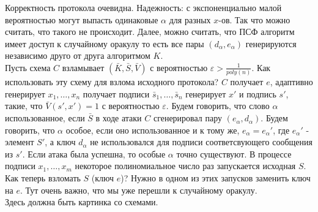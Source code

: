 \documentclass[a4paper]{article}
\theoremstyle{definition}
\theoremstyle{plain}
\begin{document}
\noindent Корректность протокола очевидна. Надежность: с экспоненциально малой вероятностью
могут выпасть одинаковые $\alpha$ для разных $x$-ов. Так что можно считать, что
такого не происходит. Далее, можно считать, что ПСФ алгоритм имеет доступ к случайному оракулу то есть
все пары $(d_{\alpha}, e_{\alpha})$ генерируются независимо друго от друга алгоритмом $K$.~\\

\noindent Пусть схема $C$ взламывает $(\bar{K}, \bar{S}, \bar{V})$
с вероятностью $\varepsilon > \frac{1}{poly(n)}$. Как использовать эту схему для взлома исходного
протокола? $C$ получает $e$, адаптивно генерирует $x_1, \ldots, x_n$ получает подписи
$\bar{s}_1, \ldots, \bar{s}_n$ генерирует $x'$ и подпись $s'$, такие, что
$\bar{V}(s', x') = 1$ с вероятностью $\varepsilon$. Будем говорить, что слово $\alpha$ использованное,
если $\bar{S}$ в ходе атаки $C$ сгенерировал пару $(e_{\alpha}, d_{\alpha})$.
Будем говорить, что $\alpha$ особое, если оно использованное и к тому же,
$e_{\alpha} = e_{\alpha}'$, где $e_{\alpha}'$ - элемент $S'$, а ключ $d_{\alpha}$
не использовался для подписи соответсвующего сообщения из $s'$.
Если атака была успешна, то особые $\alpha$ точно существуют.
В процессе подписи $x_1, \ldots, x_m$ некоторое полиномиальное число раз запускается
исходная $S$. Как теперь взломать $S$ (ключ $e$)? Нужно в одном из этих запусков
заменить ключ на $e$. Тут очень важно, что мы уже перешли к случайному оракулу.~\\

\noindent Здесь должна быть картинка со схемами.
\end{document}
